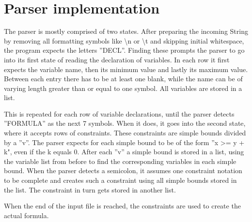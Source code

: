 
\section{Parser implementation}
The parser is mostly comprised of two states. After preparing the incoming String by removing all formatting symbols like \textbackslash n or \textbackslash t and skipping initial whitespace, the program expects the letters ''DECL''. Finding these prompts the parser to go into its first state of reading the declaration of variables. In each row it first expects the variable name, then its minimum value and lastly its maximum value. Between each entry there has to be at least one blank, while the name can be of varying length greater than or equal to one symbol. All variables are stored in a list.

This is repeated for each row of variable declarations, until the parser detects ''FORMULA'' as the next 7 symbols. When it does, it goes into the second state, where it accepts rows of constraints. These constraints are simple bounds divided by a ''v''. The parser expects for each simple bound to be of the form ''x >= y + k", even if the k equals 0. After each ''v'' a simple bound is stored in a list, using the variable list from before to find the corresponding variables in each simple bound. When the parser detects a semicolon, it assumes one constraint notation to be complete and creates such a constraint using all simple bounds stored in the list. The constraint in turn gets stored in another list.

When the end of the input file is reached, the constraints are used to create the actual formula.